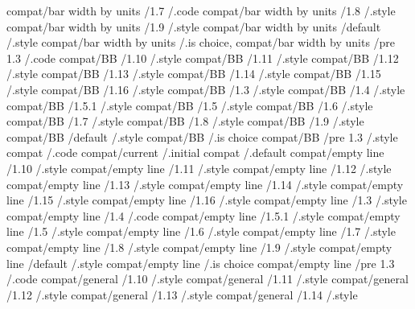 compat/bar width by units      /1.7         /.code
compat/bar width by units      /1.8         /.style
compat/bar width by units      /1.9         /.style
compat/bar width by units      /default     /.style
compat/bar width by units                   /.is choice, 
compat/bar width by units      /pre 1.3     /.code
compat/BB                      /1.10        /.style
compat/BB                      /1.11        /.style
compat/BB                      /1.12        /.style
compat/BB                      /1.13        /.style
compat/BB                      /1.14        /.style
compat/BB                      /1.15        /.style
compat/BB                      /1.16        /.style
compat/BB                      /1.3         /.style
compat/BB                      /1.4         /.style
compat/BB                      /1.5.1       /.style
compat/BB                      /1.5         /.style
compat/BB                      /1.6         /.style
compat/BB                      /1.7         /.style
compat/BB                      /1.8         /.style
compat/BB                      /1.9         /.style
compat/BB                      /default     /.style
compat/BB                                   /.is choice
compat/BB                      /pre 1.3     /.style
compat                                      /.code
compat/current                              /.initial
compat                                      /.default
compat/empty line              /1.10        /.style
compat/empty line              /1.11        /.style
compat/empty line              /1.12        /.style
compat/empty line              /1.13        /.style
compat/empty line              /1.14        /.style
compat/empty line              /1.15        /.style
compat/empty line              /1.16        /.style
compat/empty line              /1.3         /.style
compat/empty line              /1.4         /.code
compat/empty line              /1.5.1       /.style
compat/empty line              /1.5         /.style
compat/empty line              /1.6         /.style
compat/empty line              /1.7         /.style
compat/empty line              /1.8         /.style
compat/empty line              /1.9         /.style
compat/empty line              /default     /.style
compat/empty line                           /.is choice
compat/empty line              /pre 1.3     /.code
compat/general                 /1.10        /.style
compat/general                 /1.11        /.style
compat/general                 /1.12        /.style
compat/general                 /1.13        /.style
compat/general                 /1.14        /.style
